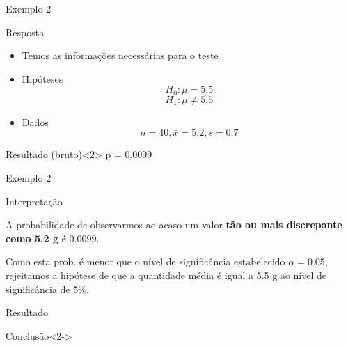 \documentclass{beamer}
\begin{document}
\begin{frame}{\scriptsize Exemplo 2}
  \begin{exampleblock}{Resposta}
    \footnotesize
    \begin{itemize}
    \footnotesize
  \item Temos as informações necessárias para o teste
  \item Hipóteses
      \begin{displaymath}
        H_0: \mu = 5.5
      \end{displaymath}
      \begin{displaymath}
        H_1: \mu \ne 5.5
      \end{displaymath}
    \item Dados
      \begin{displaymath}
        n=40, \bar{x} = 5.2, s = 0.7
      \end{displaymath}
    \end{itemize}
  \end{exampleblock}
  \begin{exampleblock}{Resultado (bruto)}<2>
    \footnotesize
    p = 0.0099
  \end{exampleblock}
\end{frame}

\begin{frame}{\scriptsize Exemplo 2}
  \begin{exampleblock}{Interpretação}
    \scriptsize

    A probabilidade de observarmos \alert{ao acaso} um valor {\bf tão
      ou mais discrepante como 5.2 g} é 0.0099.

    \bigskip

    Como esta prob. é menor que o nível de significância estabelecido
    $\alpha=0.05$, rejeitamos a hipótese de que a quantidade média é
    igual a 5.5 g ao nível de significância de 5\%.
  \end{exampleblock}
  \begin{exampleblock}{Resultado}
    \footnotesize

  \end{exampleblock}
  \begin{exampleblock}{Conclusão}<2->
    \footnotesize
  \end{exampleblock}
\end{frame}
\end{document}
